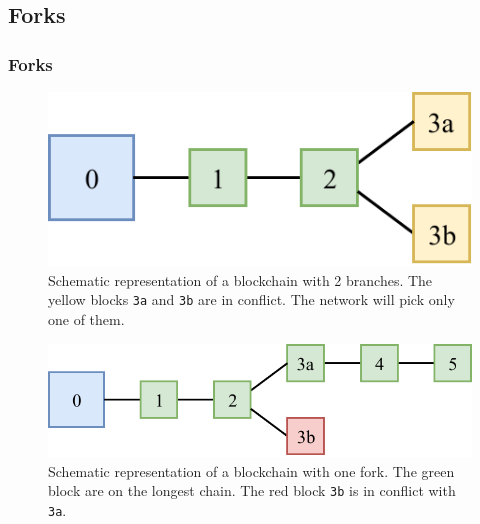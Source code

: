 \documentclass[pdf]{beamer}
\begin{document}
\subsection{Forks}
\begin{frame}
	\frametitle{Forks}
	\begin{overprint}
		\begin{figure}
			\centering
			\vspace*{0.5cm}
			\includegraphics[scale=0.9]{figures/forks_1}
			\vspace*{0.5cm}
			\caption{
				Schematic representation of a blockchain with \num{2} branches.
				The yellow blocks \texttt{3a} and \texttt{3b} are in conflict.
				The network will pick only one of them.
			}
		\end{figure}
		\begin{figure}
			\centering
			\vspace*{0.5cm}
			\includegraphics[scale=0.9]{figures/forks_2}
			\vspace*{0.5cm}
			\caption{
				Schematic representation of a blockchain with one fork.
				The green block are on the longest chain.
				The red block \texttt{3b} is in conflict with \texttt{3a}.
			}
		\end{figure}
	\end{overprint}
\end{frame}
\end{document}
